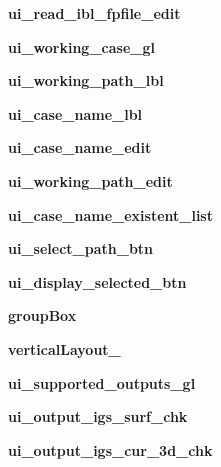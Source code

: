 \begin{DoxyCompactItemize}
{\bfseries ui\+\_\+read\+\_\+ibl\+\_\+fpfile\+\_\+edit}
\item 
\hypertarget{a00075_a050e1f0c2f0a5c8d15ca21021459c06d}{}\label{a00075_a050e1f0c2f0a5c8d15ca21021459c06d} 
{\bfseries ui\+\_\+working\+\_\+case\+\_\+gl}
\item 
\hypertarget{a00075_aae8ee2dceedfebed42a95b5122615de8}{}\label{a00075_aae8ee2dceedfebed42a95b5122615de8} 
{\bfseries ui\+\_\+working\+\_\+path\+\_\+lbl}
\item 
\hypertarget{a00075_a0d4435462e6a1f2672c93af7e87b719c}{}\label{a00075_a0d4435462e6a1f2672c93af7e87b719c} 
{\bfseries ui\+\_\+case\+\_\+name\+\_\+lbl}
\item 
\hypertarget{a00075_ac790262e3ac621cfe957cdd36f94d817}{}\label{a00075_ac790262e3ac621cfe957cdd36f94d817} 
{\bfseries ui\+\_\+case\+\_\+name\+\_\+edit}
\item 
\hypertarget{a00075_a7978ca560b83fbc4bd3859b7bba05153}{}\label{a00075_a7978ca560b83fbc4bd3859b7bba05153} 
{\bfseries ui\+\_\+working\+\_\+path\+\_\+edit}
\item 
\hypertarget{a00075_a007ebda4f46ac96952c59e60a2fa8f3b}{}\label{a00075_a007ebda4f46ac96952c59e60a2fa8f3b} 
{\bfseries ui\+\_\+case\+\_\+name\+\_\+existent\+\_\+list}
\item 
\hypertarget{a00075_a0f508ef0b3e47a027a63dd3cde363ef4}{}\label{a00075_a0f508ef0b3e47a027a63dd3cde363ef4} 
{\bfseries ui\+\_\+select\+\_\+path\+\_\+btn}
\item 
\hypertarget{a00075_adc08aa0dfe6e33f10acea28994425d3a}{}\label{a00075_adc08aa0dfe6e33f10acea28994425d3a} 
{\bfseries ui\+\_\+display\+\_\+selected\+\_\+btn}
\item 
\hypertarget{a00075_a4ed36f6ea3986be4c380c6f5ba4587d4}{}\label{a00075_a4ed36f6ea3986be4c380c6f5ba4587d4} 
{\bfseries group\+Box}
\item 
\hypertarget{a00075_ab105030a0e14f15ea1514f18cd3202b7}{}\label{a00075_ab105030a0e14f15ea1514f18cd3202b7} 
{\bfseries vertical\+Layout\+\_}
\item 
\hypertarget{a00075_a1c1efdbb64f8efbd47af031c8817f807}{}\label{a00075_a1c1efdbb64f8efbd47af031c8817f807} 
{\bfseries ui\+\_\+supported\+\_\+outputs\+\_\+gl}
\item 
\hypertarget{a00075_a204f840f1c7dc77ccd5d23fcbe6dd3c7}{}\label{a00075_a204f840f1c7dc77ccd5d23fcbe6dd3c7} 
{\bfseries ui\+\_\+output\+\_\+igs\+\_\+surf\+\_\+chk}
\item 
\hypertarget{a00075_a306e3ab99bf3dfab97fa540a27d15cbe}{}\label{a00075_a306e3ab99bf3dfab97fa540a27d15cbe} 
{\bfseries ui\+\_\+output\+\_\+igs\+\_\+cur\+\_\+3d\+\_\+chk}

\end{DoxyCompactItemize}
